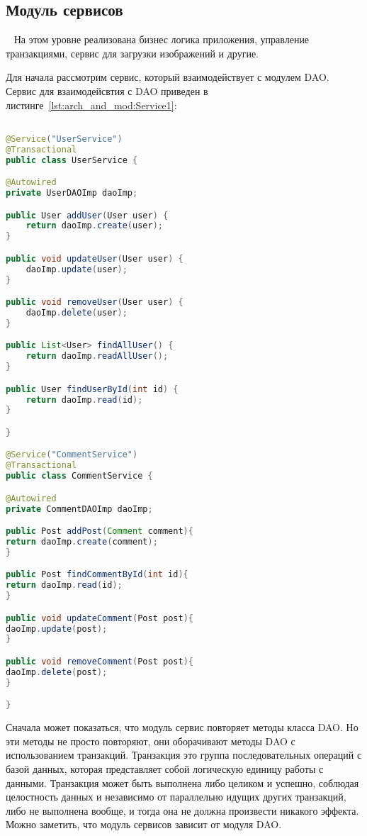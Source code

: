 \subsection{Модуль сервисов}~
\label{sec:arch_and_mod:regex}
На этом уровне реализована бизнес логика приложения, управление транзакциями, сервис для загрузки изображений и другие. 

Для начала рассмотрим сервис, который взаимодействует с модулем DAO. Сервис для взаимодейсвтия с DAO приведен в листинге~\ref{lst:arch_and_mod:Service1}:

\begin{lstlisting}[language=Java, style=rubystyle, caption={Использование DAO в сервисах}, label=lst:arch_and_mod:Service1]

@Service("UserService")
@Transactional
public class UserService {

@Autowired
private UserDAOImp daoImp;

public User addUser(User user) {
	return daoImp.create(user);
}

public void updateUser(User user) {
	daoImp.update(user);
}

public void removeUser(User user) {
	daoImp.delete(user);
}

public List<User> findAllUser() {
	return daoImp.readAllUser();
}

public User findUserById(int id) {
	return daoImp.read(id);
}

}

@Service("CommentService")
@Transactional
public class CommentService {

@Autowired
private CommentDAOImp daoImp;

public Post addPost(Comment comment){
return daoImp.create(comment);
}

public Post findCommentById(int id){
return daoImp.read(id);
}

public void updateComment(Post post){
daoImp.update(post);
}

public void removeComment(Post post){
daoImp.delete(post);
}

}

\end{lstlisting}

Сначала может показаться, что модуль сервис повторяет методы класса DAO. Но эти методы не просто повторяют, они оборачивают методы DAO с использованием транзакций. Транзакция это группа последовательных операций с базой данных, которая представляет собой логическую единицу работы с данными. Транзакция может быть выполнена либо целиком и успешно, соблюдая целостность данных и независимо от параллельно идущих других транзакций, либо не выполнена вообще, и тогда она не должна произвести никакого эффекта. Можно заметить, что модуль сервисов зависит от модуля DAO.

